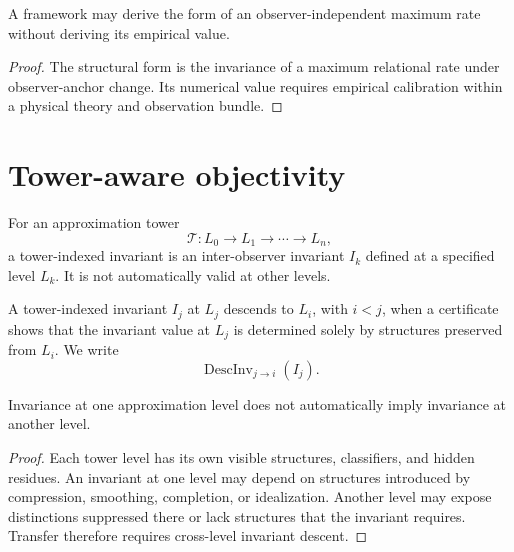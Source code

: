 \begin{corollary}
\label{cor:structural-form-empirical-value-distinct}
A framework may derive the form of an observer-independent maximum rate without deriving its empirical value.
\end{corollary}

\begin{proof}
The structural form is the invariance of a maximum relational rate under observer-anchor change. Its numerical value requires empirical calibration within a physical theory and observation bundle.
\end{proof}

\section{Tower-aware objectivity}
\label{sec:tower-aware-objectivity}

\begin{definition}
\label{def:tower-indexed-invariant}
For an approximation tower
$$
\mathcal T:L_0\to L_1\to\cdots\to L_n,
$$
a tower-indexed invariant is an inter-observer invariant $I_k$ defined at a specified level $L_k$. It is not automatically valid at other levels.
\end{definition}

\begin{definition}
\label{def:cross-level-invariant-descent}
A tower-indexed invariant $I_j$ at $L_j$ descends to $L_i$, with $i<j$, when a certificate shows that the invariant value at $L_j$ is determined solely by structures preserved from $L_i$. We write
$$
\operatorname{DescInv}_{j\to i}(I_j).
$$
\end{definition}

\begin{theorem}
\label{thm:invariance-tower-relative-without-descent}
Invariance at one approximation level does not automatically imply invariance at another level.
\end{theorem}

\begin{proof}
Each tower level has its own visible structures, classifiers, and hidden residues. An invariant at one level may depend on structures introduced by compression, smoothing, completion, or idealization. Another level may expose distinctions suppressed there or lack structures that the invariant requires. Transfer therefore requires cross-level invariant descent.
\end{proof}

